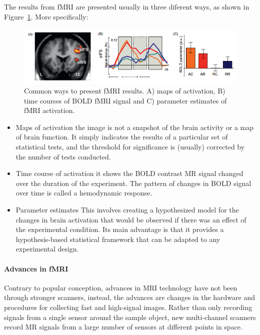 \documentclass[12pt,article,oneside,a4paper]{memoir}
\begin{document}
The results from fMRI are presented usually in three diferent ways, as shown in
Figure~\ref{fig:fMRI-results}. More specifically:
\begin{figure}
  \centering
  \includegraphics[width=\textwidth]{imgs/fMRI-results.png}
  \caption{Common ways to present fMRI results. A) maps of activation,
  B) time courses of BOLD fMRI signal and C) parameter estimates of fMRI activation.}
  \label{fig:fMRI-results}
\end{figure}

\begin{itemize}
\item Maps of activation
\subitem the image is not a snapshot of the brain activity or a map of brain function.
It simply indicates the results of a particular set of statistical tests, and the
threshold for significance is (usually) corrected by the number of tests conducted.
\item Time course of activation
\subitem it shows the BOLD contrast MR signal changed over the duration of the
experiment. The pattern of changes in BOLD signal over time is called a hemodynamic
response.
\item Parameter estimates
\subitem This involves creating a hypothesized model for the changes in brain activation
that would be observed if there was an effect of the experimental condition. Its main
advantage is that it provides a hypothesis-based statistical framework that can be
adapted to any experimental design.
\end{itemize}

\paragraph{Advances in fMRI}
Contrary to popular conception, advances in MRI technology have not been through
stronger scanners, instead, the advances are changes in the hardware and procedures
for collecting fast and high-signal images. Rather than only recording signals from a
single sensor around the sample object, new multi-channel scanners record MR signals
from a large number of sensors at different points in space.
\end{document}
